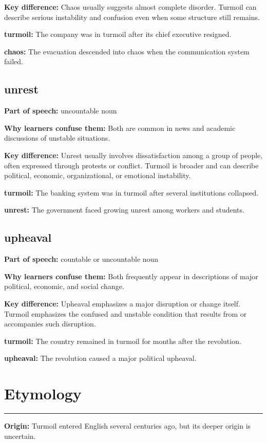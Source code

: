 \documentclass[11pt]{article}
\newcommand{\sectionrule}{\par\vspace{-0.5em}\noindent\textcolor{Accent}{\rule{\linewidth}{0.6pt}}\par}
\begin{document}
\textbf{Key difference:} Chaos usually suggests almost complete disorder. Turmoil can describe serious instability and confusion even when some structure still remains.

\textbf{turmoil:} The company was in turmoil after its chief executive resigned.

\textbf{chaos:} The evacuation descended into chaos when the communication system failed.

\subsection{unrest}
\textbf{Part of speech:} uncountable noun

\textbf{Why learners confuse them:} Both are common in news and academic discussions of unstable situations.

\textbf{Key difference:} Unrest usually involves dissatisfaction among a group of people, often expressed through protests or conflict. Turmoil is broader and can describe political, economic, organizational, or emotional instability.

\textbf{turmoil:} The banking system was in turmoil after several institutions collapsed.

\textbf{unrest:} The government faced growing unrest among workers and students.

\subsection{upheaval}
\textbf{Part of speech:} countable or uncountable noun

\textbf{Why learners confuse them:} Both frequently appear in descriptions of major political, economic, and social change.

\textbf{Key difference:} Upheaval emphasizes a major disruption or change itself. Turmoil emphasizes the confused and unstable condition that results from or accompanies such disruption.

\textbf{turmoil:} The country remained in turmoil for months after the revolution.

\textbf{upheaval:} The revolution caused a major political upheaval.

\section{Etymology}
\sectionrule
\textbf{Origin:} Turmoil entered English several centuries ago, but its deeper origin is uncertain.
\end{document}
